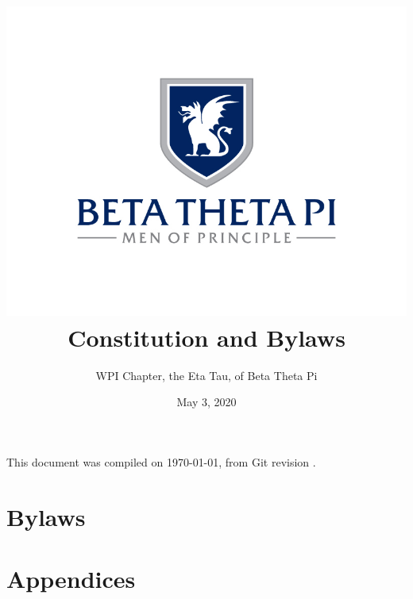 \documentclass[12pt]{report}
\title{%
    \includegraphics[width=\textwidth]{btp_tone.jpg}\\[1cm]
    Constitution and Bylaws
}
\author{WPI Chapter, the Eta Tau, of Beta Theta Pi}
\date{May 3, 2020}
\begin{document}


\begin{titlepage}
\maketitle
\end{titlepage}
\begin{center}
	\small This document was compiled on \today, from Git revision \Revision.
\end{center}
\clearpage


\clearpage
\setcounter{tocdepth}{1}
\tableofcontents
\clearpage

\renewcommand\chaptername{Article}


\setcounter{chapter}{0}
\renewcommand\chaptername{Item}
\part{Bylaws}




















\part{Appendices}
\appendix

\end{document}
